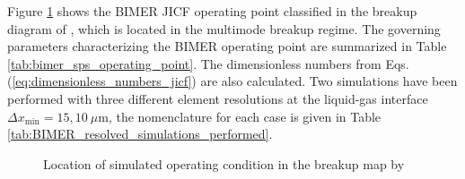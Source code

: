 
Figure \ref{fig:location_BIMER_op_in_breakup_map} shows the BIMER JICF operating point classified in the breakup diagram of \citeColor[wu_breakup_1997], which is located in the multimode breakup regime. The governing parameters characterizing the BIMER operating point are summarized in Table \ref{tab:bimer_sps_operating_point}. The dimensionless numbers from Eqs. (\ref{eq:dimensionless_numbers_jicf}) are also calculated. Two simulations have been performed with three different element resolutions at the liquid-gas interface $\Delta x_\mathrm{min} = 15, 10~\mu$m, the nomenclature for each case is given in Table \ref{tab:BIMER_resolved_simulations_performed}.

\begin{figure}[ht]
     \centering
     \vspace*{-0.1in}
     \caption{Location of simulated operating condition in the breakup map by \citeColor[wu_breakup_1997]}
      \label{fig:location_BIMER_op_in_breakup_map}
\end{figure}

